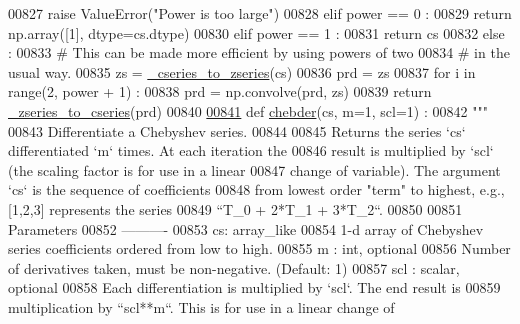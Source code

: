 \begin{DoxyCode}
00827         \textcolor{keywordflow}{raise} ValueError(\textcolor{stringliteral}{"Power is too large"})
00828     \textcolor{keywordflow}{elif} power == 0 :
00829         \textcolor{keywordflow}{return} np.array([1], dtype=cs.dtype)
00830     \textcolor{keywordflow}{elif} power == 1 :
00831         \textcolor{keywordflow}{return} cs
00832     \textcolor{keywordflow}{else} :
00833         \textcolor{comment}{# This can be made more efficient by using powers of two}
00834         \textcolor{comment}{# in the usual way.}
00835         zs = \hyperlink{namespacepyneb_1_1utils_1_1chebyshev_a659e346f7cdd9fd058850b26f7e95b17}{\_cseries\_to\_zseries}(cs)
00836         prd = zs
00837         \textcolor{keywordflow}{for} i \textcolor{keywordflow}{in} range(2, power + 1) :
00838             prd = np.convolve(prd, zs)
00839         \textcolor{keywordflow}{return} \hyperlink{namespacepyneb_1_1utils_1_1chebyshev_a2a88474ce0ea12fb26f82b7116752dc1}{\_zseries\_to\_cseries}(prd)
00840 
\hypertarget{chebyshev_8py_source_l00841}{}\hyperlink{namespacepyneb_1_1utils_1_1chebyshev_a1ed2b9248c247449584904025ec9d460}{00841} \textcolor{keyword}{def }\hyperlink{namespacepyneb_1_1utils_1_1chebyshev_a1ed2b9248c247449584904025ec9d460}{chebder}(cs, m=1, scl=1) :
00842     \textcolor{stringliteral}{"""}
00843 \textcolor{stringliteral}{    Differentiate a Chebyshev series.}
00844 \textcolor{stringliteral}{}
00845 \textcolor{stringliteral}{    Returns the series `cs` differentiated `m` times.  At each iteration the}
00846 \textcolor{stringliteral}{    result is multiplied by `scl` (the scaling factor is for use in a linear}
00847 \textcolor{stringliteral}{    change of variable).  The argument `cs` is the sequence of coefficients}
00848 \textcolor{stringliteral}{    from lowest order "term" to highest, e.g., [1,2,3] represents the series}
00849 \textcolor{stringliteral}{    ``T\_0 + 2*T\_1 + 3*T\_2``.}
00850 \textcolor{stringliteral}{}
00851 \textcolor{stringliteral}{    Parameters}
00852 \textcolor{stringliteral}{    ----------}
00853 \textcolor{stringliteral}{    cs: array\_like}
00854 \textcolor{stringliteral}{        1-d array of Chebyshev series coefficients ordered from low to high.}
00855 \textcolor{stringliteral}{    m : int, optional}
00856 \textcolor{stringliteral}{        Number of derivatives taken, must be non-negative. (Default: 1)}
00857 \textcolor{stringliteral}{    scl : scalar, optional}
00858 \textcolor{stringliteral}{        Each differentiation is multiplied by `scl`.  The end result is}
00859 \textcolor{stringliteral}{        multiplication by ``scl**m``.  This is for use in a linear change of}

\end{DoxyCode}
